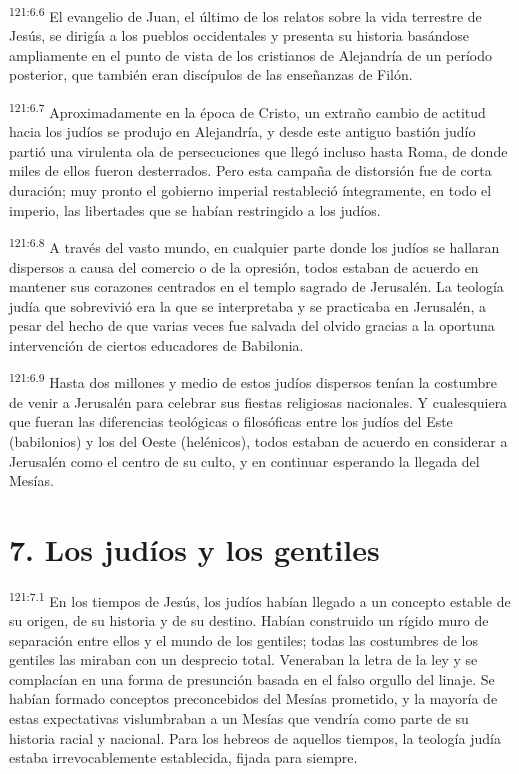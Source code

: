 \par
\textsuperscript{121:6.6} El evangelio de Juan, el último de los relatos sobre la vida terrestre de Jesús, se dirigía a los pueblos occidentales y presenta su historia basándose ampliamente en el punto de vista de los cristianos de Alejandría de un período posterior, que también eran discípulos de las enseñanzas de Filón.

\par
\textsuperscript{121:6.7} Aproximadamente en la época de Cristo, un extraño cambio de actitud hacia los judíos se produjo en Alejandría, y desde este antiguo bastión judío partió una virulenta ola de persecuciones que llegó incluso hasta Roma, de donde miles de ellos fueron desterrados. Pero esta campaña de distorsión fue de corta duración; muy pronto el gobierno imperial restableció íntegramente, en todo el imperio, las libertades que se habían restringido a los judíos.

\par
\textsuperscript{121:6.8} A través del vasto mundo, en cualquier parte donde los judíos se hallaran dispersos a causa del comercio o de la opresión, todos estaban de acuerdo en mantener sus corazones centrados en el templo sagrado de Jerusalén. La teología judía que sobrevivió era la que se interpretaba y se practicaba en Jerusalén, a pesar del hecho de que varias veces fue salvada del olvido gracias a la oportuna intervención de ciertos educadores de Babilonia.

\par
\textsuperscript{121:6.9} Hasta dos millones y medio de estos judíos dispersos tenían la costumbre de venir a Jerusalén para celebrar sus fiestas religiosas nacionales. Y cualesquiera que fueran las diferencias teológicas o filosóficas entre los judíos del Este (babilonios) y los del Oeste (helénicos), todos estaban de acuerdo en considerar a Jerusalén como el centro de su culto, y en continuar esperando la llegada del Mesías.

\section*{7. Los judíos y los gentiles}
\par
\textsuperscript{121:7.1} En los tiempos de Jesús, los judíos habían llegado a un concepto estable de su origen, de su historia y de su destino. Habían construido un rígido muro de separación entre ellos y el mundo de los gentiles; todas las costumbres de los gentiles las miraban con un desprecio total. Veneraban la letra de la ley y se complacían en una forma de presunción basada en el falso orgullo del linaje. Se habían formado conceptos preconcebidos del Mesías prometido, y la mayoría de estas expectativas vislumbraban a un Mesías que vendría como parte de su historia racial y nacional. Para los hebreos de aquellos tiempos, la teología judía estaba irrevocablemente establecida, fijada para siempre.

